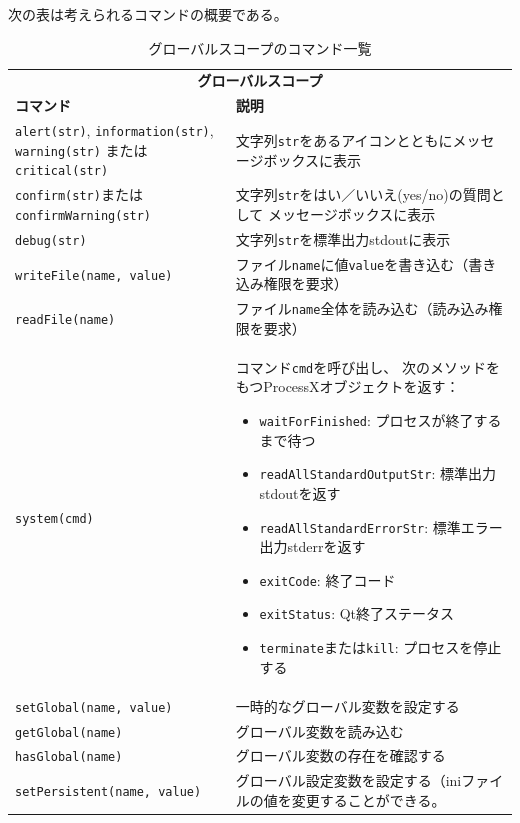 次の表は考えられるコマンドの概要である。

\begin{table}[H]
  \centering
  \caption{グローバルスコープのコマンド一覧}
  \begin{tabularx}{\linewidth}{XX}
    \hline
    \multicolumn{2}{c}{\textbf{グローバルスコープ}}\\
    \textbf{コマンド} & \textbf{説明}\\
    \hline
    \texttt{alert(str)}, \texttt{information(str)}, \texttt{warning(str)}
    または\texttt{critical(str)}
      & 文字列\texttt{str}をあるアイコンとともにメッセージボックスに表示\\
    \texttt{confirm(str)}または\texttt{confirmWarning(str)}
      & 文字列\texttt{str}をはい／いいえ(yes/no)の質問として
      メッセージボックスに表示\\
    \texttt{debug(str)} & 文字列\texttt{str}を標準出力stdoutに表示\\
    \texttt{writeFile(name, value)}
      & ファイル\texttt{name}に値\texttt{value}を書き込む（書き込み権限を要求）\\
    \texttt{readFile(name)}
      & ファイル\texttt{name}全体を読み込む（読み込み権限を要求）\\
    \texttt{system(cmd)}
      & コマンド\texttt{cmd}を呼び出し、
      次のメソッドをもつProcessXオブジェクトを返す：
      \begin{itemize}
      \item
        \texttt{waitForFinished}: プロセスが終了するまで待つ
      \item
        \texttt{readAllStandardOutputStr}: 標準出力stdoutを返す
      \item
        \texttt{readAllStandardErrorStr}: 標準エラー出力stderrを返す
      \item
        \texttt{exitCode}: 終了コード
      \item
        \texttt{exitStatus}: Qt終了ステータス
      \item
        \texttt{terminate}または\texttt{kill}: プロセスを停止する
      \end{itemize}\\
    \texttt{setGlobal(name, value)} & 一時的なグローバル変数を設定する\\
    \texttt{getGlobal(name)} & グローバル変数を読み込む\\
    \texttt{hasGlobal(name)} & グローバル変数の存在を確認する\\
    \texttt{setPersistent(name, value)}
      & グローバル設定変数を設定する（iniファイルの値を変更することができる。

\end{tabularx}
\end{table}
